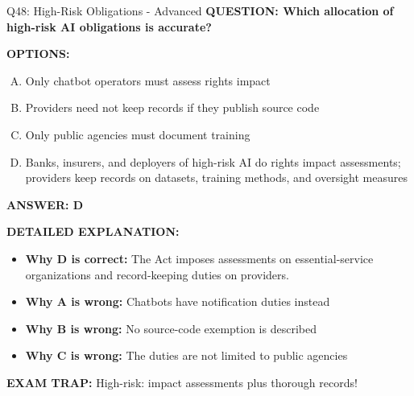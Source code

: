 \documentclass[8pt]{beamer}
\begin{document}
\begin{frame}[shrink=6]{Q48: High-Risk Obligations - Advanced}
\fontsize{6.5}{7.5}\selectfont
\textbf{QUESTION: Which allocation of high-risk AI obligations is accurate?}

\vspace{0.1cm}
\textbf{OPTIONS:}
\begin{enumerate}[A.]
\item Only chatbot operators must assess rights impact
\item Providers need not keep records if they publish source code
\item Only public agencies must document training
\item Banks, insurers, and deployers of high-risk AI do rights impact assessments; providers keep records on datasets, training methods, and oversight measures
\end{enumerate}

\vspace{0.1cm}
\textcolor{myblue}{\textbf{ANSWER: D}}

\vspace{0.1cm}
\textbf{DETAILED EXPLANATION:}
\begin{itemize}
\item \textbf{Why D is correct:} The Act imposes assessments on essential-service organizations and record-keeping duties on providers.
\item \textbf{Why A is wrong:} Chatbots have notification duties instead
\item \textbf{Why B is wrong:} No source-code exemption is described
\item \textbf{Why C is wrong:} The duties are not limited to public agencies
\end{itemize}

\textcolor{myred}{\textbf{EXAM TRAP:}} High-risk: impact assessments plus thorough records!
\end{frame}
\end{document}

